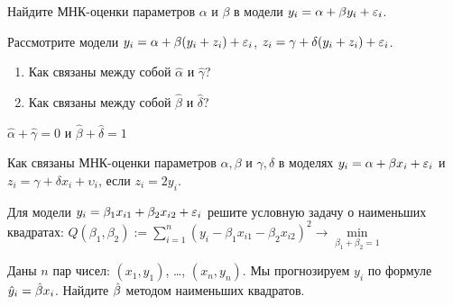\documentclass[pdftex,11pt,openany]{book}
\begin{document}
\begin{solution}
\end{solution}

\begin{problem}
 Найдите МНК-оценки параметров $\alpha$ и $\beta$ в модели $y_i = \alpha + \beta y_i + \varepsilon_i$.
\end{problem}

\begin{solution}
\end{solution}

\begin{problem}
 Рассмотрите модели $y_i = \alpha + \beta (y_i + z_i) + \varepsilon_i$, $z_i = \gamma + \delta(y_i+z_i) + \varepsilon_i$. 
\begin{enumerate}
\item Как связаны между собой $\hat{\alpha}$ и $\hat{\gamma}$?
\item  Как связаны между собой $\hat{\beta}$ и $\hat{\delta}$?
\end{enumerate} 
\end{problem}

\begin{solution}
$\hat{\alpha} + \hat{\gamma} = 0$ и $\hat{\beta} + \hat{\delta} = 1$
\end{solution}



\begin{problem}
 Как связаны МНК-оценки параметров $\alpha, \beta$ и $\gamma, \delta$ в моделях $y_i = \alpha + \beta x_i + \varepsilon_i$ и $z_i = \gamma + \delta x_i + \upsilon_i$, если $z_i = 2 y_i$.
\end{problem}

\begin{solution}
\end{solution} 

\begin{problem}
 Для модели $y_i = \beta_1 x_{i1} + \beta_2 x_{i2} + \varepsilon_i$ решите условную задачу о наименьших квадратах: $Q(\beta_1, \beta_2) := \sum_{i=1}^n (y_i - \beta_1 x_{i1} - \beta_2 x_{i2})^2 \rightarrow \underset{\beta_1 + \beta_2 = 1}{\min}$
\end{problem}

\begin{solution}
\end{solution} 
 


\begin{problem}
Даны $n$ пар чисел: $(x_1, y_1)$, \ldots, $(x_n,y_n)$. Мы прогнозируем $y_i$ по формуле $\hat{y}_i=\hat{\beta} x_i$. Найдите $\hat{\beta}$ методом наименьших квадратов. 
\end{problem} 
\end{document}
